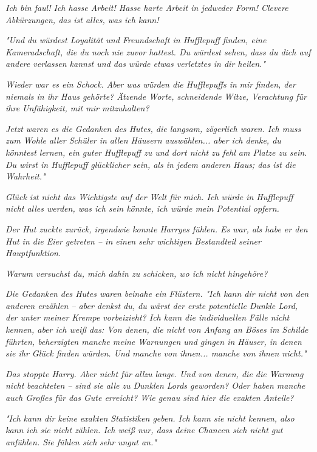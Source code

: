 {\emph{Ich bin faul! Ich hasse Arbeit! Hasse harte Arbeit in jedweder Form! Clevere Abkürzungen, das ist alles, was ich kann!}

\emph{"Und du würdest Loyalität und Freundschaft in Hufflepuff finden, eine Kameradschaft, die du noch nie zuvor hattest. Du würdest sehen, dass du dich auf andere verlassen kannst und das würde etwas verletztes in dir heilen."}

\emph{Wieder war es ein Schock.} \emph{\emph{Aber was würden die Hufflepuffs in}} \emph{mir} \emph{\emph{finden, der niemals in ihr Haus gehörte? Ätzende Worte, schneidende Witze, Verachtung für ihre Unfähigkeit, mit mir mitzuhalten?}}

\emph{Jetzt waren es die Gedanken des Hutes, die langsam, zögerlich waren.} \emph{\emph{Ich muss zum Wohle aller Schüler in allen Häusern auswählen... aber ich denke, du könntest lernen, ein guter Hufflepuff zu und dort nicht zu fehl am Platze zu sein. Du wirst in Hufflepuff glücklicher sein, als in jedem anderen Haus; das ist die Wahrheit."}}

\emph{Glück ist nicht das Wichtigste auf der Welt für mich. Ich würde in Hufflepuff nicht alles werden, was ich sein könnte, ich würde mein Potential opfern.}

\emph{Der Hut zuckte zurück, irgendwie konnte Harryes fühlen. Es war, als habe er den Hut in die Eier getreten -- in einen sehr wichtigen Bestandteil seiner Hauptfunktion.}

\emph{\emph{Warum versuchst du, mich dahin zu schicken, wo ich nicht hingehöre?}}

\emph{Die Gedanken des Hutes waren beinahe ein Flüstern.} \emph{\emph{"Ich kann dir nicht von den anderen erzählen -- aber denkst du, du wärst der erste potentielle Dunkle Lord, der unter meiner Krempe vorbeizieht? Ich kann die individuellen Fälle nicht kennen, aber ich weiß das: Von denen, die nicht von Anfang an Böses im Schilde führten, beherzigten manche meine Warnungen und gingen in Häuser, in denen sie ihr Glück finden würden. Und manche von ihnen... manche von ihnen nicht."}}

\emph{Das stoppte Harry. Aber nicht für allzu lange.} \emph{\emph{Und von denen, die die Warnung}} \emph{nicht} \emph{\emph{beachteten -- sind sie}} \emph{alle} \emph{\emph{zu Dunklen Lords geworden? Oder haben manche auch Großes für das Gute erreicht? Wie genau sind hier die exakten Anteile?}}

\emph{"Ich kann dir keine exakten Statistiken geben. Ich kann sie nicht kennen, also kann ich sie nicht zählen. Ich weiß nur, dass deine Chancen sich nicht gut anfühlen. Sie fühlen sich} \emph{sehr} \emph{\emph{ungut an."}}

}
